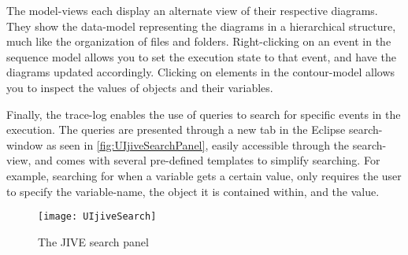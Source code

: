 The model-views each display an alternate view of their respective diagrams.%
They show the data-model representing the diagrams in a hierarchical structure, much like the organization of files and folders.
Right-clicking on an event in the sequence model allows you to set the execution state to that event, and have the diagrams updated accordingly.
Clicking on elements in the contour-model allows you to inspect the values of objects and their variables.

Finally, the trace-log enables the use of queries to search for specific events in the execution.
The queries are presented through a new tab in the Eclipse search-window as seen in \autoref{fig:UIjiveSearchPanel}, easily accessible through the search-view, and comes with several pre-defined templates to simplify searching.
For example, searching for when a variable gets a certain value, only requires the user to specify the variable-name, the object it is contained within, and the value.
\begin{figure}[H]
	\centering
	\texttt{[image: UIjiveSearch]}
	\caption{The JIVE search panel}
	\label{fig:UIjiveSearchPanel}
\end{figure}

